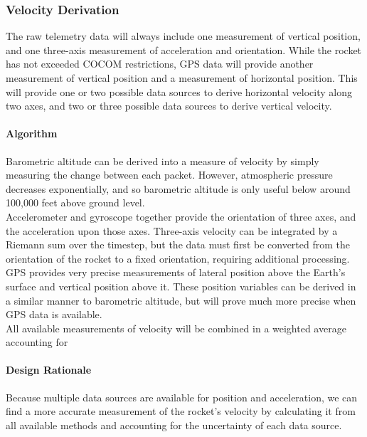 \documentclass[journal,10pt,onecolumn,compsoc]{IEEEtran}
\begin{document}
		\subsubsection{Velocity Derivation}
			\noindent The raw telemetry data will always include one measurement of vertical position, and one three-axis measurement of acceleration and orientation.
			While the rocket has not exceeded COCOM restrictions, GPS data will provide another measurement of vertical position and a measurement of horizontal position.
			This will provide one or two possible data sources to derive horizontal velocity along two axes, and two or three possible data sources to derive vertical velocity.

			\paragraph{Algorithm}
				\noindent Barometric altitude can be derived into a measure of velocity by simply measuring the change between each packet.
				However, atmospheric pressure decreases exponentially, and so barometric altitude is only useful below around 100,000 feet above ground level.\\

				\noindent Accelerometer and gyroscope together provide the orientation of three axes, and the acceleration upon those axes.
				Three-axis velocity can be integrated by a Riemann sum over the timestep, but the data must first be converted from the orientation of the rocket to a fixed orientation, requiring additional processing.\\

				\noindent GPS provides very precise measurements of lateral position above the Earth's surface and vertical position above it.
				These position variables can be derived in a similar manner to barometric altitude, but will prove much more precise when GPS data is available.\\
	
				\noindent All available measurements of velocity will be combined in a weighted average accounting for 

			\paragraph{Design Rationale}
				Because multiple data sources are available for position and acceleration, we can find a more accurate measurement of the rocket's velocity by calculating it from all available methods and accounting for the uncertainty of each data source.\\
				
\end{document}
